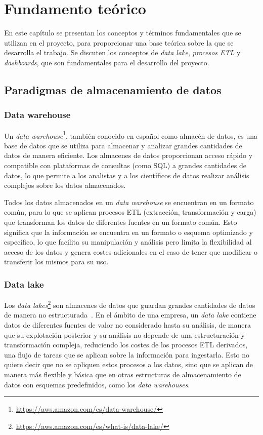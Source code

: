 \chapter{Fundamento teórico}\label{chap:teo}
En este capítulo se presentan los conceptos y términos fundamentales que se utilizan en el
proyecto, para proporcionar una base teórica sobre la que se desarrolla el trabajo. Se discuten
los conceptos de \textit{data lake}, \textit{procesos ETL} y \textit{dashboards}, que son
fundamentales para el desarrollo del proyecto.

\section{Paradigmas de almacenamiento de datos}\label{sec:paradigmas}
\subsection{Data warehouse}\label{sec:warehouse}
Un \textit{data warehouse}\footnote{\url{https://aws.amazon.com/es/data-warehouse/}},
también conocido en español como almacén de datos, es una base de datos que se utiliza para
almacenar y analizar grandes cantidades de datos de manera eficiente. Los almacenes de datos
proporcionan acceso rápido y compatible con plataformas de consultas (como SQL) a grandes
cantidades de datos, lo que permite a los analistas y a los científicos de datos realizar
análisis complejos sobre los datos almacenados.

Todos los datos almacenados en un \textit{data warehouse} se encuentran en un formato común,
para lo que se aplican procesos ETL (extracción, transformación y carga) que transforman los
datos de diferentes fuentes en un formato común. Esto significa que la información se
encuentra en un formato o esquema optimizado y específico, lo que facilita su manipulación y
análisis pero limita la flexibilidad al acceso de los datos y genera costes adicionales en
el caso de tener que modificar o transferir los mismos para su uso.


\subsection{Data lake}\label{sec:lake}
Los \textit{data lakes}\footnote{\url{https://aws.amazon.com/es/what-is/data-lake/}}
son almacenes de datos que guardan grandes cantidades de datos de manera no
estructurada~\cite{mier2023dashboards}. En el ámbito de una empresa, un \textit{data lake}
contiene datos de diferentes fuentes de valor no considerado hasta su análisis, de manera
que su explotación posterior y su análisis no depende de una estructuración y transformación
compleja, reduciendo los costes de los procesos ETL derivados, una flujo de tareas que se
aplican sobre la información para ingestarla. Esto no quiere decir que no se apliquen estos
procesos a los datos, sino que se aplican de manera más flexible y básica que en otras
estructuras de almacenamiento de datos con esquemas predefinidos, como los
\textit{data warehouses}.~\cite{pwint2018data}

